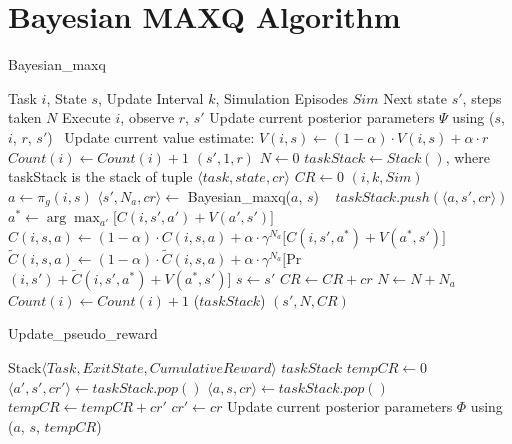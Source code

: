 \section{Bayesian MAXQ Algorithm}
\label{sec:algo}
\begin{algorithm}[t]
\caption{{\sc Bayesian\_maxq}} \label{alg:bmaxq}
\begin{algorithmic}[1]
\REQUIRE Task $i$, State $s$, Update Interval $k$, Simulation Episodes $Sim$
\ENSURE Next state $s'$, steps taken $N$
\STATE Execute $i$, observe $r$, $s'$
\STATE Update current posterior parameters $\Psi$ using ($s$, $i$, $r$, $s'$)~\label{line:update}
\STATE Update current value estimate: $V(i,s) \leftarrow (1-\alpha)\cdot V(i,s)+\alpha\cdot r$
\STATE $Count(i) \leftarrow Count(i)+1$
\RETURN $(s', 1, r)$
\ELSE 
\STATE $N \leftarrow 0$ 
\STATE $taskStack \leftarrow Stack()$, where taskStack is the stack of tuple $\langle task, state, cr \rangle$ %
\STATE $CR \leftarrow 0$
$(i, k, Sim)$
\STATE $a\leftarrow \pi_{g}(i, s)$ 
\STATE $\langle s', N_a, cr\rangle \leftarrow$ {\sc Bayesian\_maxq}($a$, $s$) ~\label{line:recursive}
\STATE $taskStack.push(\langle a, s', cr \rangle)$    
\STATE $a^*\leftarrow \arg\max_{a'}\bigl[C(i,s',a')+V(a',s')\bigr]$ ~\label{line:comp1}
\STATE $C(i,s,a)\leftarrow(1-\alpha)\cdot C(i,s,a) + \alpha\cdot \gamma^{N_a}\bigl[C(i,s',a^*)+V(a^*,s') \bigr]$~\label{line:comp2}
\STATE $\tilde{C}(i,s,a)\leftarrow(1-\alpha)\cdot \tilde{C}(i,s,a) + \alpha\cdot \gamma^{N_a}\bigl[${\sc Pr}$(i, s')+\tilde{C}(i,s',a^*)+V(a^*,s') \bigr]$
\STATE $s\leftarrow s'$
\STATE $CR \leftarrow CR+cr$
\STATE $N\leftarrow N+N_a$
\STATE $Count(i) \leftarrow Count(i)+1$
\ENDWHILE
{}($taskStack$)
\RETURN $(s', N, CR)$
\ENDIF
\end{algorithmic}
\end{algorithm} 

\begin{algorithm}[t]
\caption{{\sc Update\_pseudo\_reward}}
\begin{algorithmic}[1]
\REQUIRE Stack$\langle Task, ExitState, CumulativeReward \rangle$ $taskStack$
\STATE $ tempCR \leftarrow 0$
\STATE $\langle a', s', cr' \rangle \leftarrow taskStack.pop()$
\STATE $\langle a, s, cr \rangle \leftarrow taskStack.pop()$
\STATE $ tempCR \leftarrow tempCR+cr'$
\STATE $cr' \leftarrow cr$
\STATE Update current posterior parameters $\Phi$ using ($a$, $s$, $tempCR$)
\ENDWHILE
\end{algorithmic}
\end{algorithm}

